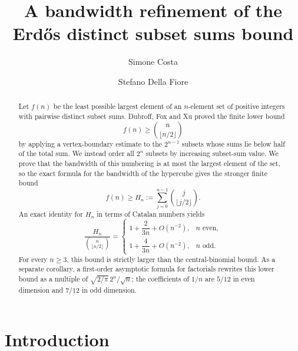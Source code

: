 \documentclass[10pt]{amsart}
\title[A bandwidth refinement of the Erd\H{o}s distinct subset sums bound]{A bandwidth refinement of the Erd\H{o}s distinct subset sums bound}
\author{Simone Costa}
\author{Stefano Della Fiore}
\date{}
\numberwithin{equation}{section}
\begin{document}
\begin{abstract}
Let $f(n)$ be the least possible largest element of an $n$-element set of
positive integers with pairwise distinct subset sums.  Dubroff, Fox and Xu
proved the finite lower bound
\[
 f(n)\ge \binom{n}{\lfloor n/2\rfloor}
\]
by applying a vertex-boundary estimate to the $2^{n-1}$ subsets whose sums lie
below half of the total sum.  We instead order all $2^n$ subsets by increasing
subset-sum value.  We prove that the bandwidth of this numbering is at most the largest
element of the set, so the exact formula for the bandwidth of the hypercube
gives the stronger finite bound
\[
 f(n)\ge H_n:=\sum_{j=0}^{n-1}\binom{j}{\lfloor j/2\rfloor}.
\]
An exact identity for $H_n$ in terms of Catalan numbers yields
\[
 \frac{H_n}{\binom{n}{\lfloor n/2\rfloor}}
 =\begin{cases}
  1+\dfrac{2}{3n}+O(n^{-2}),& n\text{ even},\\[5pt]
  1+\dfrac{4}{3n}+O(n^{-2}),& n\text{ odd}.
 \end{cases}
\]
For every $n\ge3$, this bound is strictly larger than the central-binomial
bound.  As a separate corollary, a first-order asymptotic formula for
factorials rewrites this lower bound as a multiple of
$\sqrt{2/\pi}\,2^n/\sqrt n$; the
coefficients of $1/n$ are $5/12$ in even dimension and $7/12$ in odd
dimension.
\end{abstract}
\maketitle
\enlargethispage{2pt}

\section{Introduction}
\end{document}
